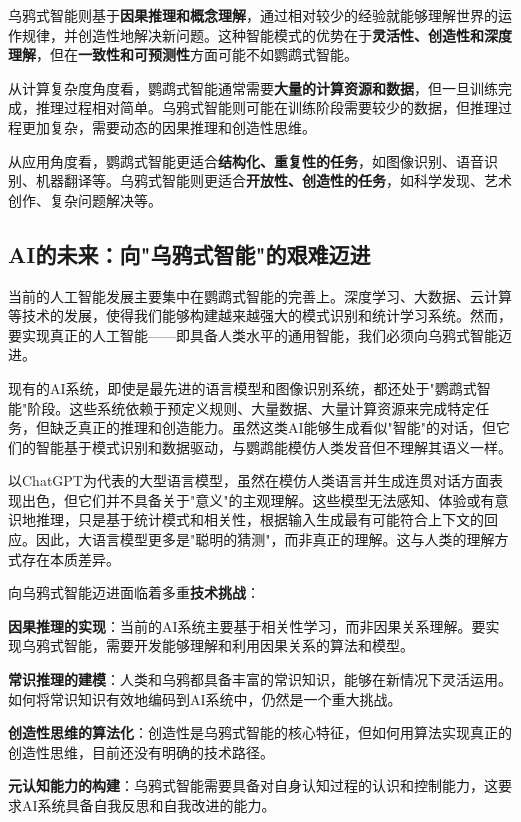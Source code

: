 乌鸦式智能则基于{\bf 因果推理和概念理解}，通过相对较少的经验就能够理解世界的运作规律，并创造性地解决新问题。这种智能模式的优势在于{\bf 灵活性、创造性和深度理解}，但在{\bf 一致性和可预测性}方面可能不如鹦鹉式智能。

从计算复杂度角度看，鹦鹉式智能通常需要{\bf 大量的计算资源和数据}，但一旦训练完成，推理过程相对简单。乌鸦式智能则可能在训练阶段需要较少的数据，但推理过程更加复杂，需要动态的因果推理和创造性思维。

从应用角度看，鹦鹉式智能更适合{\bf 结构化、重复性的任务}，如图像识别、语音识别、机器翻译等。乌鸦式智能则更适合{\bf 开放性、创造性的任务}，如科学发现、艺术创作、复杂问题解决等。

\subsection*{AI的未来：向"乌鸦式智能"的艰难迈进}

当前的人工智能发展主要集中在鹦鹉式智能的完善上。深度学习、大数据、云计算等技术的发展，使得我们能够构建越来越强大的模式识别和统计学习系统。然而，要实现真正的人工智能——即具备人类水平的通用智能，我们必须向乌鸦式智能迈进。

现有的AI系统，即使是最先进的语言模型和图像识别系统，都还处于"鹦鹉式智能"阶段。这些系统依赖于预定义规则、大量数据、大量计算资源来完成特定任务，但缺乏真正的推理和创造能力。虽然这类AI能够生成看似"智能"的对话，但它们的智能基于模式识别和数据驱动，与鹦鹉能模仿人类发音但不理解其语义一样。

以ChatGPT为代表的大型语言模型，虽然在模仿人类语言并生成连贯对话方面表现出色，但它们并不具备关于"意义"的主观理解。这些模型无法感知、体验或有意识地推理，只是基于统计模式和相关性，根据输入生成最有可能符合上下文的回应。因此，大语言模型更多是"聪明的猜测"，而非真正的理解。这与人类的理解方式存在本质差异。

向乌鸦式智能迈进面临着多重{\bf 技术挑战}：

{\bf 因果推理的实现}：当前的AI系统主要基于相关性学习，而非因果关系理解。要实现乌鸦式智能，需要开发能够理解和利用因果关系的算法和模型。

{\bf 常识推理的建模}：人类和乌鸦都具备丰富的常识知识，能够在新情况下灵活运用。如何将常识知识有效地编码到AI系统中，仍然是一个重大挑战。

{\bf 创造性思维的算法化}：创造性是乌鸦式智能的核心特征，但如何用算法实现真正的创造性思维，目前还没有明确的技术路径。

{\bf 元认知能力的构建}：乌鸦式智能需要具备对自身认知过程的认识和控制能力，这要求AI系统具备自我反思和自我改进的能力。

